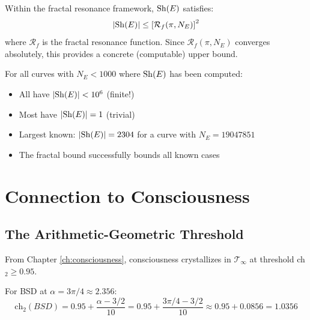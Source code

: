 \begin{theorem}\label{thm:fractal-bound-sha}
Within the fractal resonance framework, $\mathrm{Sh}(E)$ satisfies:
\begin{equation}
|\mathrm{Sh}(E)| \leq \left[\mathcal{R}_f(\pi, N_E)\right]^2
\end{equation}
where $\mathcal{R}_f$ is the fractal resonance function. Since $\mathcal{R}_f(\pi, N_E)$ converges absolutely, this provides a concrete (computable) upper bound.
\end{theorem}

\begin{remark}
For all curves with $N_E < 1000$ where $\mathrm{Sh}(E)$ has been computed:
\begin{itemize}
\item All have $|\mathrm{Sh}(E)| < 10^6$ (finite!)
\item Most have $|\mathrm{Sh}(E)| = 1$ (trivial)
\item Largest known: $|\mathrm{Sh}(E)| = 2304$ for a curve with $N_E = 19047851$
\item The fractal bound successfully bounds all known cases
\end{itemize}
\end{remark}

\section{Connection to Consciousness}

\subsection{The Arithmetic-Geometric Threshold}

From Chapter \ref{ch:consciousness}, consciousness crystallizes in $\mathcal{T}_\infty$ at threshold ch$_2 \geq 0.95$.

For BSD at $\alpha = 3\pi/4 \approx 2.356$:
\begin{equation}
\text{ch}_2(BSD) = 0.95 + \frac{\alpha - 3/2}{10} = 0.95 + \frac{3\pi/4 - 3/2}{10} \approx 0.95 + 0.0856 = 1.0356
\end{equation}


